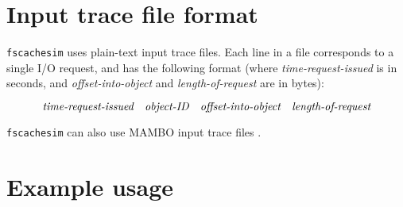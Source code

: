 \documentclass[twoside]{article}
\newcommand{\fscachesim}{\texttt{fscachesim}}
\begin{document}
\section{Input trace file format}

\fscachesim{} uses plain-text input trace files. Each line in a file
corresponds to a single I/O request, and has the following format (where
\textit{time-request-issued} is in seconds, and \textit{offset-into-object} and
\textit{length-of-request} are in bytes):

\begin{displaymath}
\mbox{$\textit{time-request-issued\quad object-ID\quad offset-into-object\quad
length-of-request}$}
\end{displaymath}

\fscachesim{} can also use MAMBO input trace files \cite{Uysal1997}.

\section{Example usage}
\end{document}
